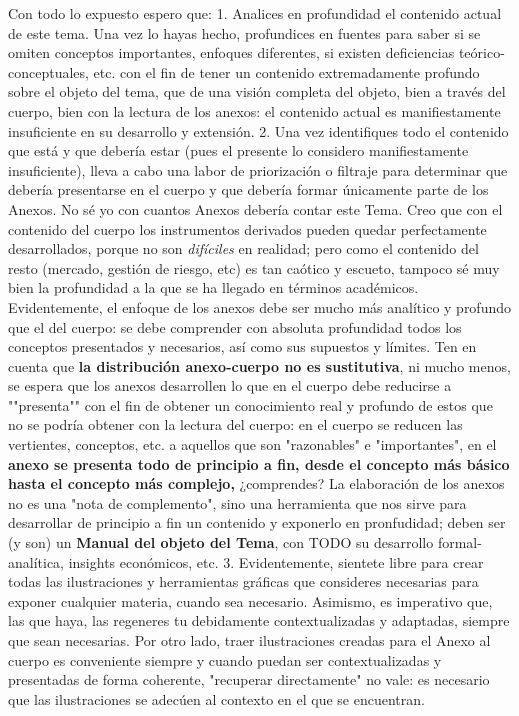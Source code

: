 \documentclass[10pt,a4paper]{article}
\newcounter{anexo}
\begin{document}
{{    Con todo lo expuesto espero que:
    1. Analices en profundidad el contenido actual de este tema. Una vez lo hayas hecho, profundices en fuentes para saber si se omiten conceptos importantes, enfoques diferentes, si existen deficiencias teórico-conceptuales, etc. con el fin de tener un contenido extremadamente profundo sobre el objeto del tema, que de una visión completa del objeto, bien a través del cuerpo, bien con la lectura de los anexos: el contenido actual es manifiestamente insuficiente en su desarrollo y extensión. 
    2. Una vez identifiques todo el contenido que está y que debería estar (pues el presente lo considero manifiestamente insuficiente), lleva a cabo una labor de priorización o filtraje para determinar que debería presentarse en el cuerpo y que debería formar únicamente parte de los Anexos. No sé yo con cuantos Anexos debería contar este Tema. Creo que con el contenido del cuerpo los instrumentos derivados pueden quedar perfectamente desarrollados, porque no son \textit{difíciles} en realidad; pero como el contenido del resto (mercado, gestión de riesgo, etc) es tan caótico y escueto, tampoco sé muy bien la profundidad a la que se ha llegado en términos académicos. Evidentemente, el enfoque de los anexos debe ser mucho más analítico y profundo que el del cuerpo: se debe comprender con absoluta profundidad todos los conceptos presentados y necesarios, así como sus supuestos y límites. Ten en cuenta que \textbf{la distribución anexo-cuerpo no es sustitutiva}, ni mucho menos, se espera que los anexos desarrollen lo que en el cuerpo debe reducirse a ""presenta"" con el fin de obtener un conocimiento real y profundo de estos que no se podría obtener con la lectura del cuerpo: en el cuerpo se reducen las vertientes, conceptos, etc. a aquellos que son "razonables" e "importantes", en el \textbf{anexo se presenta todo de principio a fin, desde el concepto más básico hasta el concepto más complejo,} ¿comprendes? La elaboración de los anexos no es una "nota de complemento", sino una herramienta que nos sirve para desarrollar de principio a fin un contenido y exponerlo en pronfudidad; deben ser (y son) un \textbf{Manual del objeto del Tema}, con TODO su desarrollo formal-analítica, insights económicos, etc. 
    3. Evidentemente, sientete libre para crear todas las ilustraciones y herramientas gráficas que consideres necesarias para exponer cualquier materia, cuando sea necesario. Asimismo, es imperativo que, las que haya, las regeneres tu debidamente contextualizadas y adaptadas, siempre que sean necesarias. Por otro lado, traer ilustraciones creadas para el Anexo al cuerpo es conveniente siempre y cuando puedan ser contextualizadas y presentadas de forma coherente, "recuperar directamente" no vale: es necesario que las ilustraciones se adecúen al contexto en el que se encuentran.
}}
\end{document}
